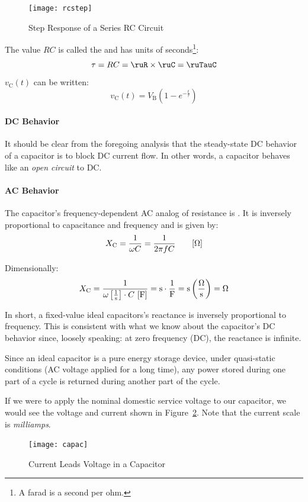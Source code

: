 \documentclass[11pt]{article}
\begin{document}
\begin{figure}[ht]
  \centering
  \texttt{[image: rcstep]}
  \caption{Step Response of a Series RC Circuit}
  \label{fig:rcstep}
\end{figure}

The value $RC$ is called the  and has units of
seconds\footnote{A farad is a second per ohm.}:
\[
\tau = RC = \ruR\times\ruC = \ruTauC
\]
$v_\mathrm{C}(t)$ can be written:
\[
v_\mathrm{C}(t) = V_\mathrm{B}\left(1 - e^{-\frac{t}{\tau}}\right)
\]


\paragraph{DC Behavior}

It should be clear from the foregoing analysis that the steady-state
DC behavior of a capacitor is to block DC current flow. In other
words, a capacitor behaves like an \emph{open circuit} to DC.


\paragraph{AC Behavior}

The capacitor's frequency-dependent AC analog of resistance is
. It is inversely proportional to
capacitance and frequency and is given by:
\[
X_\mathrm{C} = \frac{1}{\omega C} = \frac{1}{2\pi f C} \qquad\bunit{\Omega}
\]

Dimensionally:
\[
X_\mathrm{C} = \frac{1}{\omega\bunit{1}{s}\cdot C~\bunit{F}} = \unit{s}\cdot\unit{1}{F} = \unit{s}\left(\unit{\Omega}{s}\right) = \unit{\Omega}
\]

In short, a fixed-value ideal capacitors's reactance is inversely
proportional to frequency. This is consistent with what we know about
the capacitor's DC behavior since, loosely speaking: at zero frequency
(DC), the reactance is infinite.

Since an ideal capacitor is a pure energy storage device, under
quasi-static conditions (AC voltage applied for a long time), any
power stored during one part of a cycle is returned during another
part of the cycle.

If we were to apply the nominal domestic service voltage to our \ruC
capacitor, we would see the voltage and current shown in
Figure~\ref{fig:capac}. Note that the current scale is
\emph{milliamps}.

\begin{figure}
  \centering
  \texttt{[image: capac]}
  \caption{Current Leads Voltage in a Capacitor}
  \label{fig:capac}
\end{figure}
\end{document}
